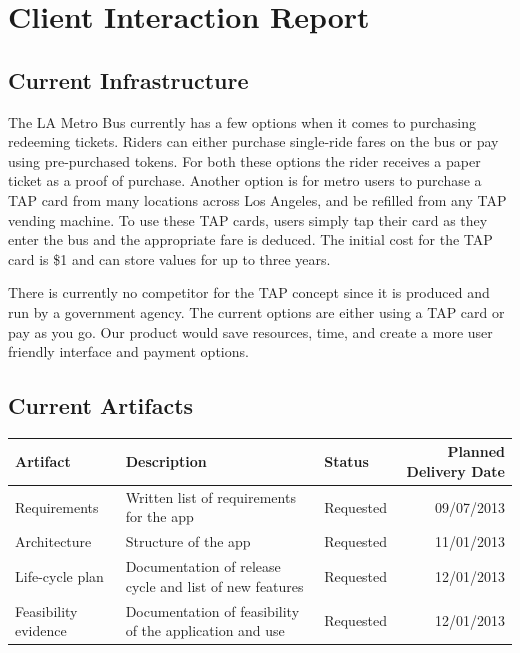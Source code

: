 \section{Client Interaction Report}
\subsection{Current Infrastructure}
The LA Metro Bus currently has a few options when it comes to purchasing redeeming tickets. Riders can either purchase single-ride fares on the bus or pay using pre-purchased tokens. For both these options the rider receives a paper ticket as a proof of purchase. Another option is for metro users to purchase a TAP card from many locations across Los Angeles, and be refilled from any TAP vending machine. To use these TAP cards, users simply tap their card as they enter the bus and the appropriate fare is deduced. The initial cost for the TAP card is \$1 and can store values for up to three years. 

There is currently no competitor for the TAP concept since it is produced and run by a government agency. The current options are either using a TAP card or pay as you go. Our product would save resources, time, and create a more user friendly interface and payment options.

\subsection{Current Artifacts}
\begin{table}[h]
    \begin{tabularx}{\textwidth}{lXlr}\hline
    Artifact              & Description                                              & Status & Planned Delivery Date          \\
    \hline
    Requirements          & Written list of requirements for the app                 & Requested                   & 09/07/2013                              \\
    Architecture          & Structure of the app                                     & Requested                   & 11/01/2013                              \\
    Life-cycle plan       &  Documentation of release cycle and list of new features & Requested                   & 12/01/2013                             \\
    Feasibility evidence  & Documentation of feasibility of the application and use  & Requested                   & 12/01/2013                              \\
    \hline
    \end{tabularx}
\end{table}
\newpage
